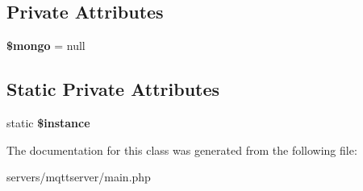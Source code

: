\subsection*{Private Attributes}
\begin{DoxyCompactItemize}
\item 
\mbox{\label{class_data_server_a267c301782128be64c2372bdd47dd6e9}} 
{\bfseries \$mongo} = null
\end{DoxyCompactItemize}
\subsection*{Static Private Attributes}
\begin{DoxyCompactItemize}
\item 
\mbox{\label{class_data_server_ad9d7ce33ebb142b70e58b68052ca0ea8}} 
static {\bfseries \$instance}
\end{DoxyCompactItemize}


The documentation for this class was generated from the following file\+:\begin{DoxyCompactItemize}
\item 
servers/mqttserver/main.\+php\end{DoxyCompactItemize}
